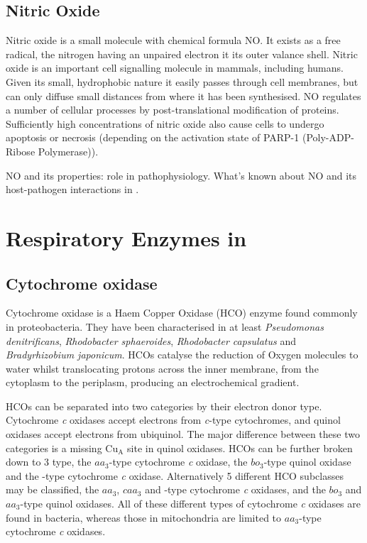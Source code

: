 \subsection{Nitric Oxide}
Nitric oxide is a small molecule with chemical formula NO. It exists as a free radical, the nitrogen having an unpaired electron it its outer valance shell. Nitric oxide is an important cell signalling molecule in mammals, including humans\cite{Blaise2005}. Given its small, hydrophobic nature it easily passes through cell membranes, but can only diffuse small distances from where it has been synthesised. NO regulates a number of cellular processes by post-translational modification of proteins. Sufficiently high concentrations of nitric oxide also cause cells to undergo apoptosis or necrosis (depending on the activation state of PARP-1 (Poly-ADP-Ribose Polymerase)).

NO and its properties: role in pathophysiology. What's known about NO and its host-pathogen interactions in \Nm{}.

\section{Respiratory Enzymes in \Nm{}}
\subsection{\texorpdfstring{Cytochrome \cbbthree{} oxidase}{Cytochrome cbb3 oxidase}}
Cytochrome \cbbthree{} oxidase is a Haem Copper Oxidase (HCO) enzyme found commonly in proteobacteria. They have been characterised in at least \textit{Pseudomonas denitrificans}, \textit{Rhodobacter sphaeroides}, \textit{Rhodobacter capsulatus} and \textit{Bradyrhizobium japonicum}\cite{Pitcher2004}. HCOs catalyse the reduction of Oxygen molecules to water whilst translocating protons across the inner membrane, from the cytoplasm to the periplasm, producing an electrochemical gradient.

HCOs can be separated into two categories by their electron donor type. Cytochrome \textit{c} oxidases accept electrons from \textit{c}-type cytochromes, and quinol oxidases accept electrons from ubiquinol. The major difference between these two categories is a missing $\mathrm{Cu}_\mathrm{A}$ site in quinol oxidases\cite{Puustinen1996}. HCOs can be further broken down to 3 type, the $\mathit{aa}_3$-type cytochrome \textit{c} oxidase, the $\mathit{bo}_3$-type quinol oxidase and the \cbbthree{}-type cytochrome \textit{c} oxidase\cite{vanderOost1994}. Alternatively 5 different HCO subclasses may be classified, the $\mathit{aa}_3$, $\mathit{caa}_3$ and \cbbthree{}-type cytochrome \textit{c} oxidases, and the $\mathit{bo}_3$ and $\mathit{aa}_3$-type quinol oxidases\cite{Garcia-Horsman1994}. All of these different types of cytochrome \textit{c} oxidases are found in bacteria, whereas those in mitochondria are limited to $\mathit{aa}_3$-type cytochrome \textit{c} oxidases\cite{Keilin1939}.

